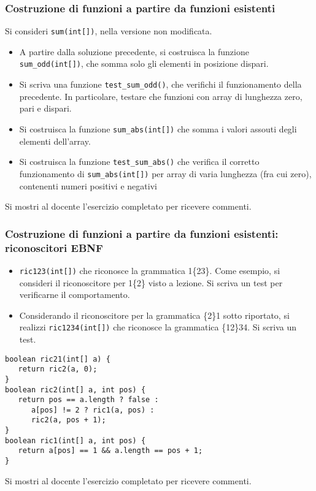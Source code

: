\documentclass{beamer}
\begin{document}
\begin{frame}[fragile]
\frametitle{Costruzione di funzioni a partire da funzioni esistenti}
Si consideri \texttt{sum(int[])}, nella versione non modificata.
\begin{itemize}
 \item A partire dalla soluzione precedente, si costruisca la funzione \texttt{sum\_odd(int[])}, che somma solo gli elementi in posizione dispari.
 \item Si scriva una funzione \texttt{test\_sum\_odd()}, che verifichi il funzionamento della precedente. In particolare, testare che funzioni con array di lunghezza zero, pari e dispari.
 \item Si costruisca la funzione \texttt{sum\_abs(int[])} che somma i valori assouti degli elementi dell'array.
 \item Si costruisca la funzione \texttt{test\_sum\_abs()} che verifica il corretto funzionamento di \texttt{sum\_abs(int[])} per array di varia lunghezza (fra cui zero), contenenti numeri positivi e negativi
\end{itemize}
Si mostri al docente l'esercizio completato per ricevere commenti.
\end{frame}

\begin{frame}[fragile]
\frametitle{Costruzione di funzioni a partire da funzioni esistenti: riconoscitori EBNF}
\begin{itemize}
 \item  \texttt{ric123(int[])} che riconosce la grammatica 1\{2\textbar{}3\}. Come esempio, si consideri il riconoscitore per 1\{2\} visto a lezione. Si scriva un test per verificarne il comportamento.
\end{itemize}
\begin{itemize}
 \item  Considerando il riconoscitore per la grammatica \{2\}1 sotto riportato, si realizzi \texttt{ric1234(int[])} che riconosce la grammatica \{1\textbar{}2\}34. Si scriva un test.
\end{itemize}
\scriptsize
\begin{verbatim}
boolean ric21(int[] a) {
   return ric2(a, 0);
}
boolean ric2(int[] a, int pos) {
   return pos == a.length ? false :
      a[pos] != 2 ? ric1(a, pos) : 
      ric2(a, pos + 1);
}
boolean ric1(int[] a, int pos) {
   return a[pos] == 1 && a.length == pos + 1;
}
\end{verbatim}
\normalsize
Si mostri al docente l'esercizio completato per ricevere commenti.
\end{frame}
\end{document}

